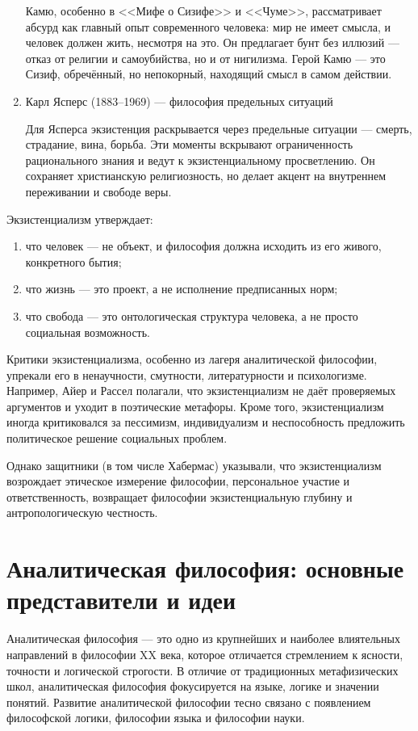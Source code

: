 \documentclass[12pt,a4paper]{article}
\begin{document}
\begin{enumerate}
		Камю, особенно в <<Мифе о Сизифе>> и <<Чуме>>, рассматривает абсурд как главный опыт современного человека: мир не имеет смысла, и человек должен жить, несмотря на это. Он предлагает бунт без иллюзий — отказ от религии и самоубийства, но и от нигилизма. Герой Камю — это Сизиф, обречённый, но непокорный, находящий смысл в самом действии.
		
		\item Карл Ясперс (1883–1969) — философия предельных ситуаций
		
		Для Ясперса экзистенция раскрывается через предельные ситуации — смерть, страдание, вина, борьба. Эти моменты вскрывают ограниченность рационального знания и ведут к экзистенциальному просветлению. Он сохраняет христианскую религиозность, но делает акцент на внутреннем переживании и свободе веры.
	\end{enumerate}
	
	Экзистенциализм утверждает:
	\begin{enumerate}
		\item что человек — не объект, и философия должна исходить из его живого, конкретного бытия;
		
		\item что жизнь — это проект, а не исполнение предписанных норм;
		
		\item что свобода — это онтологическая структура человека, а не просто социальная возможность.
	\end{enumerate}
	
	Критики экзистенциализма, особенно из лагеря аналитической философии, упрекали его в ненаучности, смутности, литературности и психологизме. Например, Айер и Рассел полагали, что экзистенциализм не даёт проверяемых аргументов и уходит в поэтические метафоры. Кроме того, экзистенциализм иногда критиковался за пессимизм, индивидуализм и неспособность предложить политическое решение социальных проблем.
	
	Однако защитники (в том числе Хабермас) указывали, что экзистенциализм возрождает этическое измерение философии, персональное участие и ответственность, возвращает философии экзистенциальную глубину и антропологическую честность.
	
	\section{Аналитическая философия: основные представители и идеи~\checkmark}
	\par Аналитическая философия — это одно из крупнейших и наиболее влиятельных направлений в философии XX века, которое отличается стремлением к ясности, точности и логической строгости. В отличие от традиционных метафизических школ, аналитическая философия фокусируется на языке, логике и значении понятий. Развитие аналитической философии тесно связано с появлением философской логики, философии языка и философии науки.
	
\end{document}
